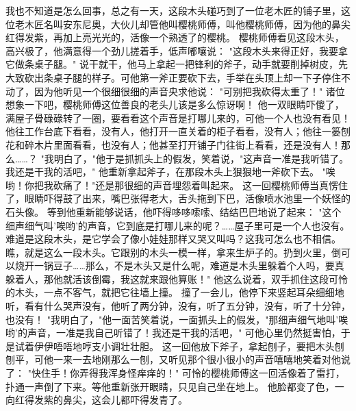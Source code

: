 \documentclass[12pt,UTF8]{ctexbook}
\begin{document}
我也不知道是怎么回事，总之有一天，这段木头碰巧到了一位老木匠的铺子里，这位老木匠名叫安东尼奥，大伙儿却管他叫樱桃师傅，叫他樱桃师傅，因为他的鼻尖红得发紫，再加上亮光光的，活像一个熟透了的樱桃。
樱桃师傅看见这段木头，高兴极了，他满意得一个劲儿搓着手，低声嘟嚷说：
"这段木头来得正好，我要拿它做条桌子腿。"
说干就干，他马上拿起一把锋利的斧子，动手就要削掉树皮，先大致砍出条桌子腿的样子。可他第一斧正要砍下去，手举在头顶上却一下子停住不动了，因为他听见一个很细很细的声音央求他说：
"可别把我砍得太重了！"
诸位想象一下吧，樱桃师傅这位善良的老头儿该是多么惊讶啊！
他一双眼睛吓傻了，满屋子骨碌碌转了一圈，要看看这个声音是打哪儿来的，可他一个人也没有看见！他往工作台底下看看，没有人，他打开一直关着的柜子看看，没有人；他往一篓刨花和碎木片里面看看，也没有人；他甚至打开铺子门往街上看看，还是没有人！那么……？
"我明白了，"他于是抓抓头上的假发，笑着说，"这声音一准是我听错了。我还是干我的活吧，"
他重新拿起斧子，在那段木头上狠狠地一斧砍下去。
"唉哟！你把我砍痛了！"还是那很细的声音埋怨着叫起来。
这一回樱桃师傅当真愣住了，眼睛吓得鼓了出来，嘴巴张得老大，舌头拖到下巴，活像喷水池里一个妖怪的石头像。
等到他重新能够说话，他吓得哆哆嗦嗦、结结巴巴地说了起来：
"这个细声细气叫'唉哟'的声音，它到底是打哪儿来的呢？……屋子里可是一个人也没有。难道是这段木头，是它学会了像小娃娃那样又哭又叫吗？这我可怎么也不相信。瞧，就是这么一段木头。它跟别的木头一模一样，拿来生炉子的。扔到火里，倒可以烧开一锅豆子……那么，不是木头又是什么呢，难道是木头里躲着个人吗，要真躲着人，那他就活该倒霉，我这就来跟他算账！"
他这么说着，双手抓住这段可怜的木头，一点不客气，就把它往墙上撞。
撞了一会儿，他停下来竖起耳朵细细地听，看有什么哭声没有，他听了两分钟，没有，听了五分钟，没有，听了十分钟，也没有！
"我明白了，"他一面苦笑着说，一面抓头上的假发，"那细声细气地叫'唉哟'的声音，一准是我自己听错了！我还是干我的活吧，"
可他心里仍然挺害怕，于是试着伊伊唔唔地哼支小调壮壮胆。
这一回他放下斧子，拿起刨子，要把木头刨刨平，可他一来一去地刚那么一刨，又听见那个很小很小的声音嘻嘻地笑着对他说了：
"快住手！你弄得我浑身怪痒痒的！"
可怜的樱桃师傅这一回活像着了雷打，扑通一声倒了下来。等他重新张开眼睛，只见自己坐在地上。
他脸都变了色，一向红得发紫的鼻尖，这会儿都吓得发青了。

\chapter{}
\end{document}
